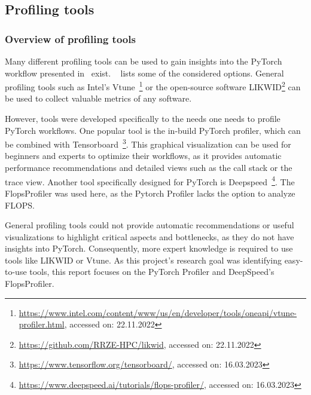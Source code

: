 \documentclass[12pt, a4paper, hidelinks]{article}
\begin{document}
\subsection{Profiling tools}

\subsubsection{Overview of profiling tools}
\label{sec:tools-overview}

Many different profiling tools can be used to gain insights into the PyTorch workflow presented in~ exist. 
~ lists some of the considered options.
General profiling tools such as Intel's Vtune~\footnote{\url{https://www.intel.com/content/www/us/en/developer/tools/oneapi/vtune-profiler.html}, accessed on: 22.11.2022} or the open-source software LIKWID\footnote{\url{https://github.com/RRZE-HPC/likwid}, accessed on: 22.11.2022} can be used to collect valuable metrics of any software.

However, tools were developed specifically to the needs one needs to profile PyTorch workflows.
One popular tool is the in-build PyTorch profiler, which can be combined with Tensorboard~\footnote{\url{https://www.tensorflow.org/tensorboard/}, accessed on: 16.03.2023}. This graphical visualization can be used for beginners and experts to optimize their workflows, as it provides automatic performance recommendations and detailed views such as the call stack or the trace view.
Another tool specifically designed for PyTorch is Deepspeed~\footnote{\url{https://www.deepspeed.ai/tutorials/flops-profiler/}, accessed on: 16.03.2023}. The FlopsProfiler was used here, as the Pytorch Profiler lacks the option to analyze FLOPS.


General profiling tools could not provide automatic recommendations or useful visualizations to highlight critical aspects and bottlenecks, as they do not have insights into PyTorch. Consequently, more expert knowledge is required to use tools like LIKWID or Vtune.
As this project's research goal was identifying easy-to-use tools, this report focuses on the PyTorch Profiler and DeepSpeed's FlopsProfiler.
\end{document}
